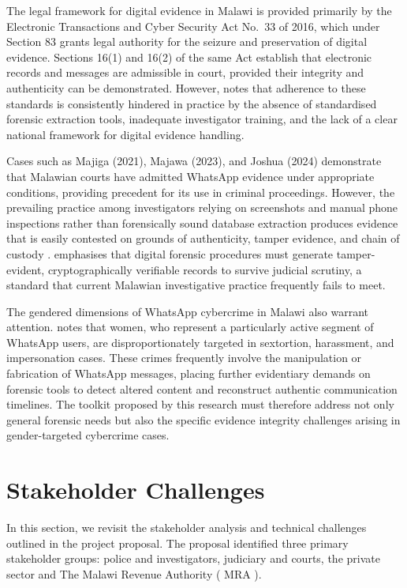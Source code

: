 \documentclass[12pt,a4paper]{report}
\begin{document}
The legal framework for digital evidence in Malawi is provided primarily by the Electronic Transactions and Cyber Security Act No.\ 33 of 2016, which under Section 83 grants legal authority for the seizure and preservation of digital evidence. Sections 16(1) and 16(2) of the same Act establish that electronic records and messages are admissible in court, provided their integrity and authenticity can be demonstrated. However, \citet{rapozoND} notes that adherence to these standards is consistently hindered in practice by the absence of standardised forensic extraction tools, inadequate investigator training, and the lack of a clear national framework for digital evidence handling.

Cases such as Majiga (2021), Majawa (2023), and Joshua (2024) demonstrate that Malawian courts have admitted WhatsApp evidence under appropriate conditions, providing precedent for its use in criminal proceedings. However, the prevailing practice among investigators relying on screenshots and manual phone inspections rather than forensically sound database extraction produces evidence that is easily contested on grounds of authenticity, tamper evidence, and chain of custody \cite{burgess2025}. \citet{guttman2022} emphasises that digital forensic procedures must generate tamper-evident, cryptographically verifiable records to survive judicial scrutiny, a standard that current Malawian investigative practice frequently fails to meet.

The gendered dimensions of WhatsApp cybercrime in Malawi also warrant attention. \citet{interpol2025} notes that women, who represent a particularly active segment of WhatsApp users, are disproportionately targeted in sextortion, harassment, and impersonation cases. These crimes frequently involve the manipulation or fabrication of WhatsApp messages, placing further evidentiary demands on forensic tools to detect altered content and reconstruct authentic communication timelines. The toolkit proposed by this research must therefore address not only general forensic needs but also the specific evidence integrity challenges arising in gender-targeted cybercrime cases.

\section{Stakeholder Challenges}

In this section, we revisit the stakeholder analysis and technical challenges outlined in the project proposal. The proposal identified three primary stakeholder groups: police and investigators, judiciary and courts, the private sector and The Malawi Revenue Authority ( MRA ).
\end{document}
